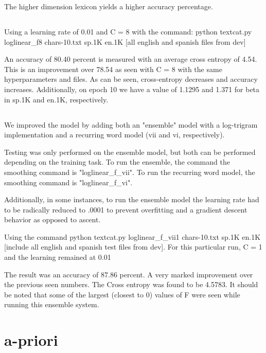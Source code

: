 \documentclass[12pt, letterpaper]{article}
\begin{document}
The higher dimension lexicon yields a higher accuracy percentage.


\subsection{}
Using a learning rate of 0.01 and C = 8 with the command: python textcat.py loglinear\_f8 chars-10.txt sp.1K en.1K [all english and spanish files from dev]

An accuracy of 80.40 percent is measured with an average cross entropy of 4.54. This is an improvement over 78.54 as seen with C = 8 with the same hyperparameters and files.
As can be seen, cross-entropy decreases and accuracy increases. Additionally, on epoch 10 we have a value of 1.1295 and 1.371 for beta in sp.1K and en.1K, respectively. 

\subsection{}
We improved the model by adding both an "ensemble" model with a log-trigram implementation and a recurring word model (vii and vi, respectively).

Testing was only performed on the ensemble model, but both can be performed depending on the training task. To run the ensemble, the command the smoothing command  is "loglinear\_f\_vii". To run the recurring word model, the smoothing command is "loglinear\_f\_vi".

Additionally, in some instances, to run the ensemble model the learning rate had to be radically reduced to .0001 to prevent overfitting and a gradient descent behavior as opposed to ascent. 

Using the command python textcat.py loglinear\_f\_vii1 chars-10.txt sp.1K en.1K [include all english and spanish test files from dev]. For this particular run, C = 1 and the learning remained at 0.01

The result was an accuracy of 87.86 percent. A very marked improvement over the previous seen  numbers. The Cross entropy was found to be 4.5783. 
It should be noted that some of the largest (closest to 0) values of F were seen while running this ensemble system. 


\section{a-priori}
\end{document}
